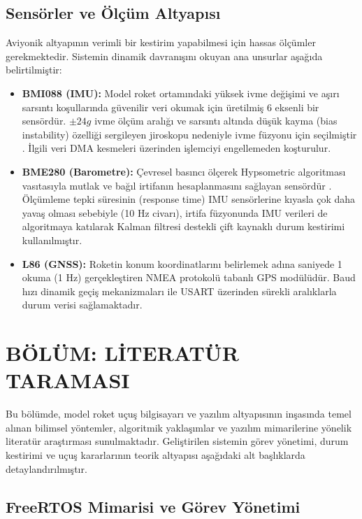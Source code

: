 \subsection{Sensörler ve Ölçüm Altyapısı}
\label{sensorler_altyapisi}
Aviyonik altyapının verimli bir kestirim yapabilmesi için hassas ölçümler gerekmektedir. Sistemin dinamik davranışını okuyan ana unsurlar aşağıda belirtilmiştir:

\begin{itemize}
    \item \textbf{BMI088 (IMU):} Model roket ortamındaki yüksek ivme değişimi ve aşırı sarsıntı koşullarında güvenilir veri okumak için üretilmiş 6 eksenli bir sensördür. $\pm 24g$ ivme ölçüm aralığı ve sarsıntı altında düşük kayma (bias instability) özelliği sergileyen jiroskopu nedeniyle ivme füzyonu için seçilmiştir \cite{bosch_bmi088}. İlgili veri DMA kesmeleri üzerinden işlemciyi engellemeden koşturulur.
    \item \textbf{BME280 (Barometre):} Çevresel basıncı ölçerek Hypsometric algoritması vasıtasıyla mutlak ve bağıl irtifanın hesaplanmasını sağlayan sensördür \cite{bosch_bme280}. Ölçümleme tepki süresinin (response time) IMU sensörlerine kıyasla çok daha yavaş olması sebebiyle (10 Hz civarı), irtifa füzyonunda IMU verileri de algoritmaya katılarak Kalman filtresi destekli çift kaynaklı durum kestirimi kullanılmıştır.
    \item \textbf{L86 (GNSS):} Roketin konum koordinatlarını belirlemek adına saniyede 1 okuma (1 Hz) gerçekleştiren NMEA protokolü tabanlı GPS modülüdür. Baud hızı dinamik geçiş mekanizmaları ile USART üzerinden sürekli aralıklarla durum verisi sağlamaktadır.
\end{itemize}

\clearpage

\section{BÖLÜM: LİTERATÜR TARAMASI}
\label{literatur_taramasi}

Bu bölümde, model roket uçuş bilgisayarı ve yazılım altyapısının inşasında temel alınan bilimsel yöntemler, algoritmik yaklaşımlar ve yazılım mimarilerine yönelik literatür araştırması sunulmaktadır. Geliştirilen sistemin görev yönetimi, durum kestirimi ve uçuş kararlarının teorik altyapısı aşağıdaki alt başlıklarda detaylandırılmıştır.

\subsection{FreeRTOS Mimarisi ve Görev Yönetimi}
\label{freertos_mimarisi_ve_gorev_yonetimi}

